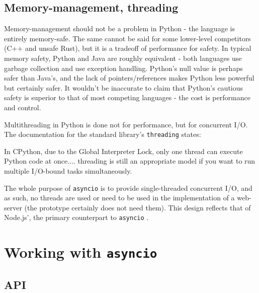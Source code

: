 \documentclass[letterpaper,twocolumn,10pt]{article}
\newcommand{\code}[1]{
    \texttt{#1}
}
\begin{document}


\subsection{Memory-management, threading}

Memory-management should not be a problem in Python - the language is entirely memory-safe.  The same
cannot be said for some lower-level competitors (C++ and unsafe Rust), but it is a tradeoff of
performance for safety.  In typical memory safety, Python and Java are roughly equivalent - both languages
use garbage collection and use exception handling.  Python's null value is perhaps safer than Java's, 
and the lack of pointers/references makes Python less powerful but certainly safer.  It wouldn't be
inaccurate to claim that Python's cautious safety is superior to that of most competing languages -
the cost is performance and control.

Multithreading in Python is done not for performance, but for concurrent I/O.  The documentation for 
the standard library's \code{threading} states:

\begin{displayquote}
    In CPython, due to the Global Interpreter Lock, only one thread can execute Python code at once....
    threading is still an appropriate model if you want to run multiple I/O-bound 
    tasks simultaneously.
\end{displayquote}

The whole purpose of \code{asyncio} is to provide single-threaded concurrent I/O, and as such, no threads
are used or need to be used in the implementation of a web-server (the prototype certainly does not need
them).  This design reflects that of Node.js', the primary counterpart to \code{asyncio}.


\section{Working with \code{asyncio}}

\subsection{API}
\end{document}
